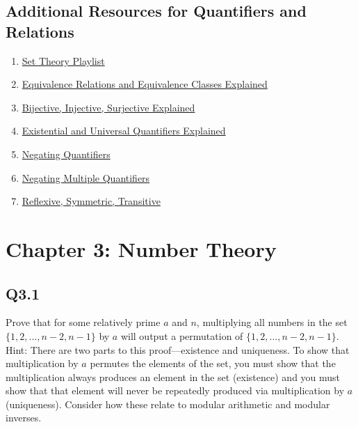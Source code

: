 \documentclass{article}
\begin{document}
\subsection*{Additional Resources for Quantifiers and Relations}
\begin{enumerate}
    \item \href{https://www.youtube.com/watch?v=tyDKR4FG3Yw&list=PLDDGPdw7e6Ag1EIznZ-m-qXu4XX3A0cIz}{Set Theory Playlist}
    \item \href{https://www.youtube.com/watch?v=ZgcTX16borA}{Equivalence Relations and Equivalence Classes Explained}
    \item \href{https://www.youtube.com/watch?v=bZred_Ksz2k&t=6s}{Bijective, Injective, Surjective Explained}
    \item \href{https://www.youtube.com/watch?v=GJpezCUMOxA}{Existential and Universal Quantifiers Explained}
    \item \href{https://www.youtube.com/watch?v=q1rKFGSiZE8}{Negating Quantifiers}
    \item \href{https://www.youtube.com/watch?v=jLVKV5LJjaw}{Negating Multiple Quantifiers}
    \item \href{https://www.youtube.com/watch?v=6fwJj14O_TM}{Reflexive, Symmetric, Transitive}
\end{enumerate}
\newpage
{}
\section*{Chapter 3: Number Theory}
\subsection*{Q3.1}
Prove that for some relatively prime $a$ and $n$, multiplying all numbers in the set $\{1,2,...,n-2,n-1\}$ by $a$ will output a permutation of $\{1,2,...,n-2,n-1\}$.
\\ Hint: There are two parts to this proof---existence and uniqueness. To show that multiplication by $a$ permutes the elements of the set, you must show that the multiplication always produces an element in the set (existence) and you must show that that element will never be repeatedly produced via multiplication by $a$ (uniqueness). Consider how these relate to modular arithmetic and modular inverses.
\newpage
{}
\end{document}
